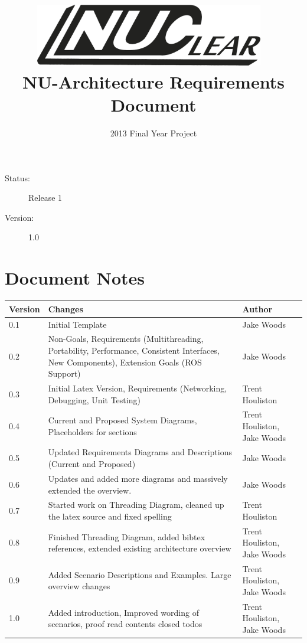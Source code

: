 \documentclass[english,12pt]{scrartcl}
\title{\includegraphics[width=0.75\textwidth]{./Logo/NUClear-logo}~\\[1cm] NU-Architecture Requirements Document}
\author{2013 Final Year Project}
\begin{document}
	\maketitle
	\vfill
	{\large
		\begin{description}
			\item [Status:] Release 1
			\item [Version:] 1.0
		\end{description}}

	\clearpage
	\tableofcontents

	\section{Document Notes}
		\begin{tabular}{ p{} | p{} | p{} }
			\textbf{Version} & \textbf{Changes} & \textbf{Author} \\
			\hline

			0.1 &
			Initial Template &
			Jake Woods \\
			\hline

			0.2 &
			Non-Goals, Requirements (Multithreading, Portability, Performance, Consistent
			Interfaces, New Components), Extension Goals (ROS Support) &
			Jake Woods \\
			\hline

			0.3 &
			Initial Latex Version, Requirements (Networking, Debugging, Unit Testing) &
			Trent Houliston \\
			\hline

			0.4 &
			Current and Proposed System Diagrams, Placeholders for sections &
			Trent Houliston, Jake Woods \\
			\hline

			0.5 &
			Updated Requirements Diagrams and Descriptions (Current and Proposed) &
			Jake Woods \\
			\hline

			0.6 &
			Updates and added more diagrams and massively extended the overview. &
			Jake Woods \\
			\hline

			0.7 &
			Started work on Threading Diagram, cleaned up the latex source and fixed spelling &
			Trent Houliston \\
			\hline

			0.8 &
			Finished Threading Diagram, added bibtex references, extended existing architecture
			overview &
			Trent Houliston, Jake Woods \\
			\hline
			
			0.9 &
			Added Scenario Descriptions and Examples. Large overview changes &
			Trent Houliston, Jake Woods \\
			\hline
			
			1.0 &
			Added introduction, Improved wording of scenarios, proof read contents closed todos &
			Trent Houliston, Jake Woods \\
			\hline
		\end{tabular}
		
\end{document}
